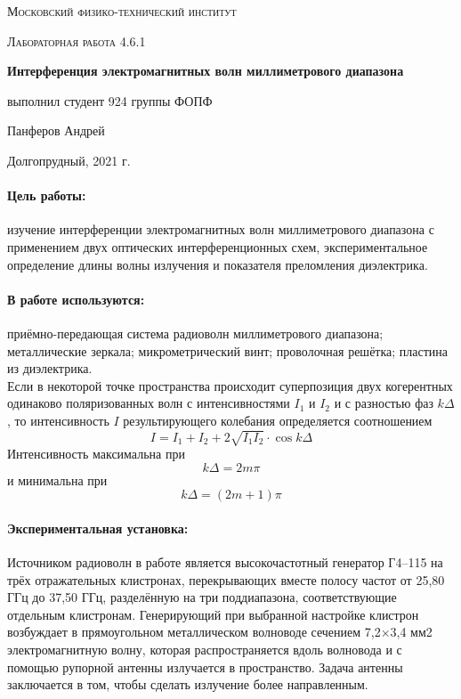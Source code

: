 \documentclass[a4paper, 12pt]{article}
\begin{document}
	
\begin{titlepage}
	\centering
	\vspace{5cm}
	{\scshape\LARGE Московский физико-технический институт \par}
	\vspace{4cm}
	{\scshape\Large Лабораторная работа 4.6.1 \par}
	\vspace{1cm}
	{\huge\bfseries Интерференция электромагнитных волн миллиметрового диапазона \par}
	\vspace{1cm}
	\vfill
\begin{flushright}
	{\large выполнил студент 924 группы ФОПФ}\par
	\vspace{0.3cm}
	{\LARGE Панферов Андрей}
\end{flushright}
	

	\vfill

	Долгопрудный, 2021 г.
\end{titlepage}

\paragraph*{Цель работы:} изучение интерференции электромагнитных волн миллиметрового диапазона с применением двух оптических интерференционных схем, экспериментальное определение длины волны излучения и показателя преломления диэлектрика.
\paragraph*{В работе используются:} приёмно-передающая система радиоволн миллиметрового диапазона; металлические зеркала; микрометрический винт; проволочная решётка; пластина из диэлектрика.
$$$$
Если в некоторой точке пространства происходит суперпозиция двух когерентных одинаково поляризованных волн с интенсивностями $I_1$ и $I_2$ и с разностью фаз $k\Delta$, то интенсивность $I$ результирующего колебания определяется соотношением
$$I = I_1 + I_2 + 2\sqrt{I_1 I_2} \cdot \cos{k\Delta}$$
Интенсивность максимальна при 
$$k\Delta = 2m\pi$$
и минимальна при
$$k\Delta = \left(2m + 1\right)\pi$$
\paragraph*{Экспериментальная установка:} Источником радиоволн в работе является высокочастотный генератор Г4–115 на трёх отражательных клистронах, перекрывающих вместе полосу частот от 25,80 ГГц до 37,50 ГГц, разделённую на три поддиапазона, соответствующие отдельным клистронам. Генерирующий при выбранной настройке клистрон возбуждает в прямоугольном металлическом волноводе сечением 7,2×3,4 мм2 электромагнитную волну, которая распространяется вдоль волновода и с помощью рупорной антенны излучается в пространство. Задача антенны заключается в том, чтобы сделать излучение более направленным.
\end{document}
